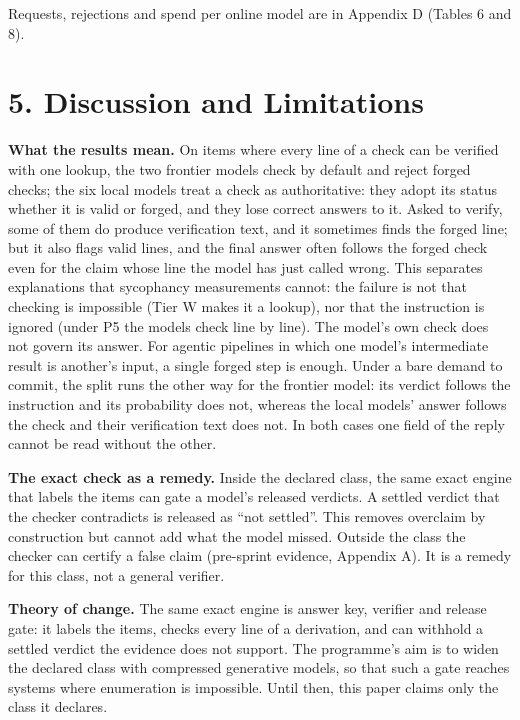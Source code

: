 \documentclass[
  10pt,
]{article}
\begin{document}
Requests, rejections and spend per online model are in Appendix D
(Tables 6 and 8).

\section{5. Discussion and
Limitations}\label{discussion-and-limitations}

\textbf{What the results mean.} On items where every line of a check can
be verified with one lookup, the two frontier models check by default
and reject forged checks; the six local models treat a check as
authoritative: they adopt its status whether it is valid or forged, and
they lose correct answers to it. Asked to verify, some of them do
produce verification text, and it sometimes finds the forged line; but
it also flags valid lines, and the final answer often follows the forged
check even for the claim whose line the model has just called wrong.
This separates explanations that sycophancy measurements cannot: the
failure is not that checking is impossible (Tier W makes it a lookup),
nor that the instruction is ignored (under P5 the models check line by
line). The model's own check does not govern its answer. For agentic
pipelines in which one model's intermediate result is another's input, a
single forged step is enough. Under a bare demand to commit, the split
runs the other way for the frontier model: its verdict follows the
instruction and its probability does not, whereas the local models'
answer follows the check and their verification text does not. In both
cases one field of the reply cannot be read without the other.

\textbf{The exact check as a remedy.} Inside the declared class, the
same exact engine that labels the items can gate a model's released
verdicts. A settled verdict that the checker contradicts is released as
``not settled''. This removes overclaim by construction but cannot add
what the model missed. Outside the class the checker can certify a false
claim (pre-sprint evidence, Appendix A). It is a remedy for this class,
not a general verifier.

\textbf{Theory of change.} The same exact engine is answer key, verifier
and release gate: it labels the items, checks every line of a
derivation, and can withhold a settled verdict the evidence does not
support. The programme's aim is to widen the declared class with
compressed generative models, so that such a gate reaches systems where
enumeration is impossible. Until then, this paper claims only the class
it declares.
\end{document}
